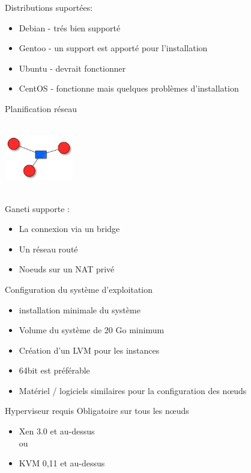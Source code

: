 \begin{frame}
Distributions suportées:\\
\begin{itemize}
\item Debian - trés bien supporté
\item Gentoo - un support est apporté pour l'installation
\item Ubuntu - devrait fonctionner
\item CentOS - fonctionne mais quelques problèmes d'installation
\end{itemize}
\end{frame}

\begin{frame}{Planification réseau}
\begin{center}
  \includegraphics[width=3cm,height=3cm]{images_presentation/network.png}
\end{center}
\begin{block}{Ganeti supporte :}
\begin{itemize}
\item La connexion via un bridge
\pause
\item Un réseau routé
\pause
\item Noeuds sur un NAT privé
\end{itemize}
\end{block}
\end{frame}

\begin{frame}{Configuration du système d'exploitation}
\begin{itemize}
\item installation minimale du système
\pause
\item Volume du système de 20 Go minimum
\pause
\item Création d'un LVM pour les instances
\pause
\item 64bit est préférable
\pause
\item Matériel / logiciels similaires pour la configuration des nœuds
\end{itemize}
\end{frame}

\begin{frame}{Hyperviseur requis}
Obligatoire sur tous les nœuds
\begin{itemize}
\item Xen 3.0 et au-dessus \\ou
\pause
\item KVM 0,11 et au-dessus
\end{itemize}
\end{frame}


